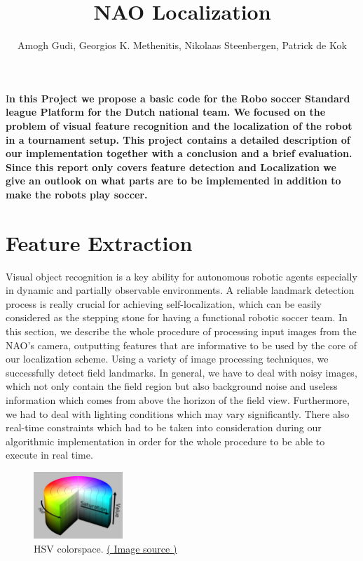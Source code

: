 \documentclass[	DIV=calc,%
							paper=a4,%
							fontsize=11pt,%
							twocolumn]{scrartcl}	 					%
\title{NAO Localization}					%
\author{Amogh Gudi, Georgios K. Methenitis, Nikolaas Steenbergen, Patrick de Kok\\}											%
\date{}																				%
\newcommand{\initial}[1]{%
     \lettrine[lines=3,lhang=0.3,nindent=0em]{
     				\color{DarkGoldenrod}
     				{\textsf{#1}}}{}}
\begin{document}
\maketitle
\thispagestyle{fancy} 			%
\initial{I}\textbf{n this Project we propose a basic code for the Robo soccer Standard league Platform for the Dutch national team. We focused on the problem of visual feature recognition and the localization of the robot in a tournament setup. This project contains a detailed description of our implementation together with a conclusion and a brief evaluation. Since this report only covers feature detection and Localization we give an outlook on what parts are to be implemented in addition to make the robots play soccer.}

\section{Feature Extraction}
Visual object recognition is a key ability for autonomous robotic agents especially in dynamic and partially observable environments. A reliable landmark detection process is really crucial for achieving self-localization, which can be easily considered as the stepping stone for having a functional robotic soccer team. In this section, we describe the whole procedure of processing input images from the NAO's camera, outputting features that are informative to be used by the core of our localization scheme.  Using a variety of image processing techniques, we successfully detect field landmarks. In general, we have to deal with noisy images, which not only contain the field region but also background noise and useless information which comes from above the horizon of the field view. Furthermore, we had to deal with lighting conditions which may vary significantly.
There also real-time constraints which had to be taken into consideration during our algorithmic implementation in order for the whole procedure to be able to execute in real time.

\begin{figure}[t!]
  \caption{HSV colorspace. \href{http://en.wikipedia.org/wiki/HSL_and_HSV}{( Image source )}}
  \label{hsv}
  \centering
    \includegraphics[width=0.3\textwidth]{figures/1280px-HSV_color_solid_cylinder_alpha_lowgamma.png}
\end{figure}
\end{document}
